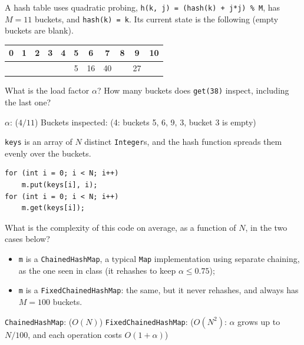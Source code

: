 \begin{question}
A hash table uses quadratic probing, \lstinline|h(k, j) = (hash(k) + j*j) % M|, has $M = 11$ buckets, and \mbox{\lstinline|hash(k) = k|}. Its current state is the following (empty buckets are blank).

\medskip
\begin{center}
\renewcommand{\arraystretch}{1.3}
\begin{tabular}{|*{11}{c|}}
\hline
0 & 1 & 2 & 3 & 4 & 5 & 6 & 7 & 8 & 9 & 10 \\
\hline
\phantom{00} & \phantom{00} & \phantom{00} & \phantom{00} & \phantom{00} & 5 & 16 & 40 & \phantom{00} & 27 & \phantom{00} \\
\hline
\end{tabular}
\end{center}
\medskip

What is the load factor $\alpha$? How many buckets does \lstinline|get(38)| inspect, including the last one?

$\alpha$: \underline{\hspace{1in}} \ifanswers ($4/11$)\fi
\qquad Buckets inspected: \underline{\hspace{1in}} \ifanswers (4: buckets 5, 6, 9, 3, bucket 3 is empty)\fi
\end{question}

\begin{question}
\lstinline|keys| is an array of $N$ distinct \lstinline|Integer|s, and the hash function spreads them evenly over the buckets.

\begin{lstlisting}
for (int i = 0; i < N; i++)
    m.put(keys[i], i);
for (int i = 0; i < N; i++)
    m.get(keys[i]);
\end{lstlisting}

What is the complexity of this code on average, as a function of $N$, in the two cases below?
\begin{itemize}[leftmargin=2em,itemsep=1pt,topsep=2pt]
\item \lstinline|m| is a \lstinline|ChainedHashMap|, a typical \lstinline|Map| implementation using separate chaining, as the one seen in class (it rehashes to keep $\alpha \le 0.75$);
\item \lstinline|m| is a \lstinline|FixedChainedHashMap|: the same, but it never rehashes, and always has $M = 100$ buckets.
\end{itemize}

\lstinline|ChainedHashMap|: \underline{\hspace{1in}} \ifanswers ($O(N)$)\fi
\qquad \lstinline|FixedChainedHashMap|: \underline{\hspace{1in}} \ifanswers ($O(N^2)$: $\alpha$ grows up to $N/100$, and each operation costs $O(1 + \alpha)$)\fi
\end{question}

